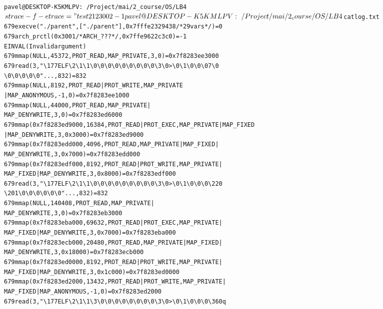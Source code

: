 \documentclass[pdf, unicode, 12pt, a4paper,oneside,fleqn]{article}
\begin{document}
\begin{alltt}
pavel@DESKTOP-K5KMLPV:~/Project/mai/2_course/OS/LB4$ strace -f -e trace=
"%process,read,write,dup2,mmap" -o log.txt ./parent
test2
1 2 3
0 0
2 -1
pavel@DESKTOP-K5KMLPV:~/Project/mai/2_course/OS/LB4$ cat log.txt
679   execve("./parent", ["./parent"], 0x7fffe2329438 /* 29 vars */) = 0
679   arch_prctl(0x3001 /* ARCH_??? */, 0x7ffe9622c3c0) = -1 
EINVAL (Invalid argument)
679   mmap(NULL, 45372, PROT_READ, MAP_PRIVATE, 3, 0) = 0x7f8283ee3000
679   read(3, "\textbackslash177ELF\textbackslash2\textbackslash1\textbackslash1\textbackslash0\textbackslash0\textbackslash0\textbackslash0\textbackslash0\textbackslash0\textbackslash0\textbackslash0\textbackslash0\textbackslash3\textbackslash0>\textbackslash0\textbackslash1\textbackslash0\textbackslash0\textbackslash0 7\textbackslash0
\textbackslash0\textbackslash0\textbackslash0\textbackslash0\textbackslash0"..., 832) = 832
679   mmap(NULL, 8192, PROT_READ|PROT_WRITE, MAP_PRIVATE
|MAP_ANONYMOUS, -1, 0) = 0x7f8283ee1000
679   mmap(NULL, 44000, PROT_READ, MAP_PRIVATE|
MAP_DENYWRITE, 3, 0) = 0x7f8283ed6000
679   mmap(0x7f8283ed9000, 16384, PROT_READ|PROT_EXEC, MAP_PRIVATE|MAP_FIXED
|MAP_DENYWRITE, 3, 0x3000) = 0x7f8283ed9000
679   mmap(0x7f8283edd000, 4096, PROT_READ, MAP_PRIVATE|MAP_FIXED|
MAP_DENYWRITE, 3, 0x7000) = 0x7f8283edd000
679   mmap(0x7f8283edf000, 8192, PROT_READ|PROT_WRITE, MAP_PRIVATE|
MAP_FIXED|MAP_DENYWRITE, 3, 0x8000) = 0x7f8283edf000
679   read(3, "\textbackslash177ELF\textbackslash2\textbackslash1\textbackslash1\textbackslash0\textbackslash0\textbackslash0\textbackslash0\textbackslash0\textbackslash0\textbackslash0\textbackslash0\textbackslash0\textbackslash3\textbackslash0>\textbackslash0\textbackslash1\textbackslash0\textbackslash0\textbackslash0\textbackslash220
\textbackslash201\textbackslash0\textbackslash0\textbackslash0\textbackslash0\textbackslash0\textbackslash0"..., 832) = 832
679   mmap(NULL, 140408, PROT_READ, MAP_PRIVATE|
MAP_DENYWRITE, 3, 0) = 0x7f8283eb3000
679   mmap(0x7f8283eba000, 69632, PROT_READ|PROT_EXEC, MAP_PRIVATE|
MAP_FIXED|MAP_DENYWRITE, 3, 0x7000) = 0x7f8283eba000
679   mmap(0x7f8283ecb000, 20480, PROT_READ, MAP_PRIVATE|MAP_FIXED|
MAP_DENYWRITE, 3, 0x18000) = 0x7f8283ecb000
679   mmap(0x7f8283ed0000, 8192, PROT_READ|PROT_WRITE, MAP_PRIVATE|
MAP_FIXED|MAP_DENYWRITE, 3, 0x1c000) = 0x7f8283ed0000
679   mmap(0x7f8283ed2000, 13432, PROT_READ|PROT_WRITE, MAP_PRIVATE|
MAP_FIXED|MAP_ANONYMOUS, -1, 0) = 0x7f8283ed2000
679   read(3, "\textbackslash177ELF\textbackslash2\textbackslash1\textbackslash1\textbackslash3\textbackslash0\textbackslash0\textbackslash0\textbackslash0\textbackslash0\textbackslash0\textbackslash0\textbackslash0\textbackslash3\textbackslash0>\textbackslash0\textbackslash1\textbackslash0\textbackslash0\textbackslash0\textbackslash360q

\end{alltt}
\end{document}
